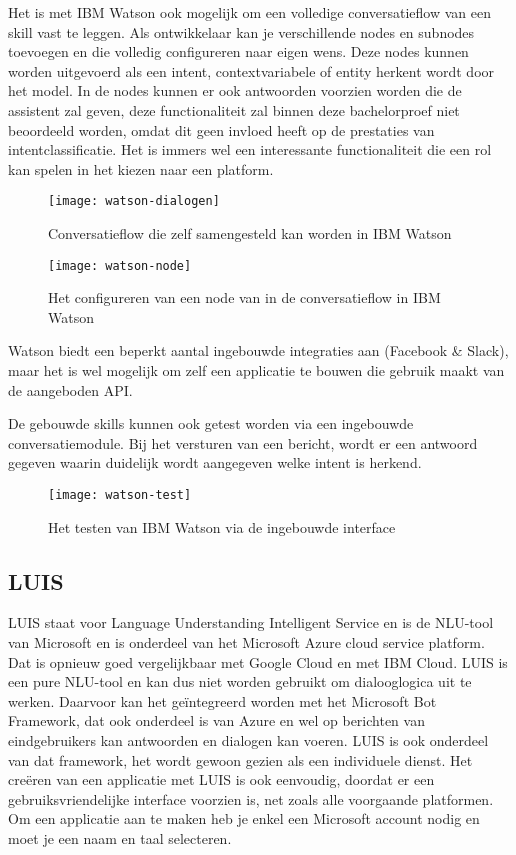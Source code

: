 Het is met IBM Watson ook mogelijk om een volledige conversatieflow van een skill vast te leggen. Als ontwikkelaar kan je verschillende nodes en subnodes toevoegen en die volledig configureren naar eigen wens. Deze nodes kunnen worden uitgevoerd als een intent, contextvariabele of entity herkent wordt door het model. In de nodes kunnen er ook antwoorden voorzien worden die de assistent zal geven, deze functionaliteit zal binnen deze bachelorproef niet beoordeeld worden, omdat dit geen invloed heeft op de prestaties van intentclassificatie. Het is immers wel een interessante functionaliteit die een rol kan spelen in het kiezen naar een platform.

\begin{figure}[H]
    \label{fig:watson-dialogen}
    \centering
    \texttt{[image: watson-dialogen]}
    \caption{Conversatieflow die zelf samengesteld kan worden in IBM Watson}
\end{figure}

\begin{figure}[H]
    \label{fig:watson-node}
    \centering
    \texttt{[image: watson-node]}
    \caption{Het configureren van een node van in de conversatieflow in IBM Watson}
\end{figure}

Watson biedt een beperkt aantal ingebouwde integraties aan (Facebook \& Slack), maar het is wel mogelijk om zelf een applicatie te bouwen die gebruik maakt van de aangeboden API.

De gebouwde skills kunnen ook getest worden via een ingebouwde conversatiemodule. Bij het versturen van een bericht, wordt er een antwoord gegeven waarin duidelijk wordt aangegeven welke intent is herkend.

\begin{figure}[H]
    \label{fig:watson-test}
    \centering
    \texttt{[image: watson-test]}
    \caption{Het testen van IBM Watson via de ingebouwde interface}
\end{figure}

\subsection{LUIS}
\label{subsec:werking-platformen-luis}

LUIS staat voor Language Understanding Intelligent Service en is de NLU-tool van Microsoft en is onderdeel van het Microsoft Azure cloud service platform. Dat is opnieuw goed vergelijkbaar met Google Cloud en met IBM Cloud. LUIS is een pure NLU-tool en kan dus niet worden gebruikt om dialooglogica uit te werken. Daarvoor kan het geïntegreerd worden met het Microsoft Bot Framework, dat ook onderdeel is van Azure en wel op berichten van eindgebruikers kan antwoorden en dialogen kan voeren. LUIS is ook onderdeel van dat framework, het wordt gewoon gezien als een individuele dienst. Het creëren van een applicatie met LUIS is ook eenvoudig, doordat er een gebruiksvriendelijke interface voorzien is, net zoals alle voorgaande platformen. Om een applicatie aan te maken heb je enkel een Microsoft account nodig en moet je een naam en taal selecteren.

